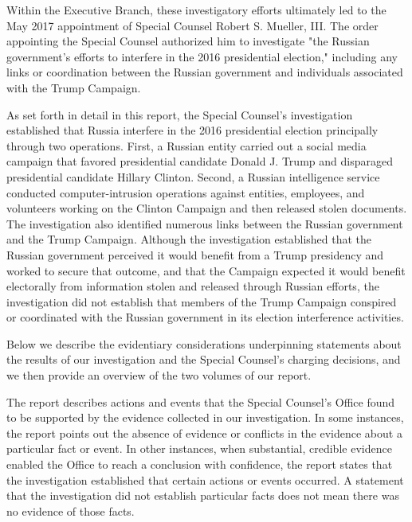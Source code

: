 Within the Executive Branch, these investigatory efforts ultimately led to the May 2017 appointment of Special Counsel Robert S. Mueller, III.
The order appointing the Special Counsel authorized him to investigate "the Russian government's efforts to interfere in the 2016 presidential election," including any links or coordination between the Russian government and individuals associated with the Trump Campaign.

As set forth in detail in this report, the Special Counsel's investigation established that Russia interfere in the 2016 presidential election principally through two operations.
First, a Russian entity carried out a social media campaign that favored presidential candidate Donald J. Trump and disparaged presidential candidate Hillary Clinton.
Second, a Russian intelligence service conducted computer-intrusion operations against entities, employees, and volunteers working on the Clinton Campaign and then released stolen documents.
The investigation also identified numerous links between the Russian government and the Trump Campaign.
Although the investigation established that the Russian government perceived it would benefit from a Trump presidency and worked to secure that outcome, and that the Campaign expected it would benefit electorally from information stolen and released through Russian efforts, the investigation did not establish that members of the Trump Campaign conspired or coordinated with the Russian government in its election interference activities.

\hr

Below we describe the evidentiary considerations underpinning statements about the results of our investigation and the Special Counsel's charging decisions, and we then provide an overview of the two volumes of our report.

The report describes actions and events that the Special Counsel's Office found to be supported by the evidence collected in our investigation.
In some instances, the report points out the absence of evidence or conflicts in the evidence about a particular fact or event.
In other instances, when substantial, credible evidence enabled the Office to reach a conclusion with confidence, the report states that the investigation established that certain actions or events occurred.
A statement that the investigation did not establish particular facts does not mean there was no evidence of those facts.

